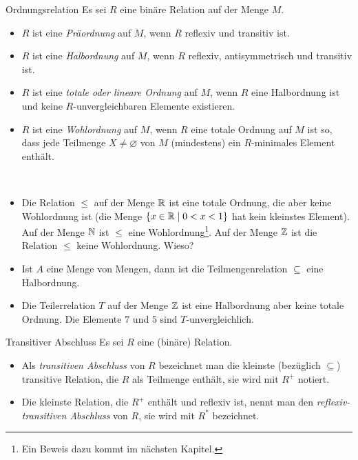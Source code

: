    \begin{definition}{Ordnungsrelation}
    Es sei $R$ eine binäre Relation auf der Menge $M$.
    \begin{itemize}
    \item $R$ ist eine \textit{Präordnung} auf $M$, wenn $R$ reflexiv und transitiv ist.
    \item $R$ ist eine \textit{Halbordnung} auf $M$, wenn $R$ reflexiv, antisymmetrisch und transitiv ist.
    \item $R$ ist eine \textit{totale oder lineare Ordnung} auf $M$, wenn $R$ eine Halbordnung ist und keine $R$-unvergleichbaren Elemente existieren.
    \item $R$ ist eine \textit{Wohlordnung} auf $M$, wenn $R$ eine totale Ordnung auf $M$ ist so, dass jede Teilmenge $X\neq\varnothing$ von $M$ (mindestens) ein $R$-minimales Element enthält.
    \end{itemize}
    \end{definition}


    \begin{example}~
    \begin{itemize}
    \item Die Relation $\leq$ auf der Menge $\mathbb{R}$ ist eine totale Ordnung, die aber keine Wohlordnung ist (die Menge $\{x\in\mathbb{R}\mid 0<x<1\}$ hat kein kleinstes Element). Auf der Menge $\mathbb{N}$ ist $\leq$ eine Wohlordnung\footnote{Ein Beweis dazu kommt im nächsten Kapitel.}. Auf der Menge $\mathbb{Z}$ ist die Relation $\leq$ keine Wohlordnung. Wieso?
    \item Ist $A$ eine Menge von Mengen, dann ist die Teilmengenrelation $\subseteq$ eine Halbordnung.
    \item Die Teilerrelation $T$ auf der Menge $\mathbb{Z}$ ist eine Halbordnung aber keine totale Ordnung. Die Elemente $7$ und $5$ sind $T$-unvergleichlich.
    \end{itemize}
    \end{example}

    \begin{definition}{Transitiver Abschluss}
        Es sei $R$ eine (bin\"are) Relation.
        \begin{itemize}
            \item Als \textit{transitiven Abschluss} von $R$ bezeichnet man die kleinste
            (bezüglich $\subseteq$) transitive Relation, die $R$ als Teilmenge enthält,
            sie wird mit $R^+$ notiert.
            \item Die kleinste Relation, die $R^+$ enthält und reflexiv ist, nennt man den
            \textit{reflexiv-transitiven Abschluss} von $R$, sie wird mit $R^*$ bezeichnet.
        \end{itemize}
    \end{definition}

